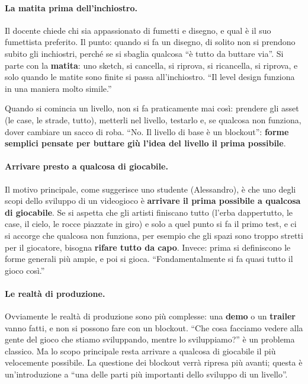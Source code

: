 \paragraph{La matita prima dell'inchiostro.} Il docente chiede chi sia
appassionato di fumetti e disegno, e qual è il suo fumettista preferito. Il
punto: quando si fa un disegno, di solito non si prendono subito gli
inchiostri, perché se si sbaglia qualcosa ``è tutto da buttare via''. Si parte
con la \textbf{matita}: uno sketch, si cancella, si riprova, si ricancella, si
riprova, e solo quando le matite sono finite si passa all'inchiostro. ``Il level
design funziona in una maniera molto simile.''

Quando si comincia un livello, non si fa praticamente mai così: prendere gli
asset (le case, le strade, tutto), metterli nel livello, testarlo e, se qualcosa
non funziona, dover cambiare un sacco di roba. ``No. Il livello di base è un
blockout'': \textbf{forme semplici pensate per buttare giù l'idea del livello il
prima possibile}.

\paragraph{Arrivare presto a qualcosa di giocabile.} Il motivo principale, come
suggerisce uno studente (Alessandro), è che uno degli scopi dello sviluppo di un
videogioco è \textbf{arrivare il prima possibile a qualcosa di giocabile}. Se si
aspetta che gli artisti finiscano tutto (l'erba dappertutto, le case, il cielo,
le rocce piazzate in giro) e solo a quel punto si fa il primo test, e ci si
accorge che qualcosa non funziona, per esempio che gli spazi sono troppo stretti
per il giocatore, bisogna \textbf{rifare tutto da capo}. Invece: prima si
definiscono le forme generali più ampie, e poi si gioca. ``Fondamentalmente si
fa quasi tutto il gioco così.''

\paragraph{Le realtà di produzione.} Ovviamente le realtà di produzione sono
più complesse: una \textbf{demo} o un \textbf{trailer} vanno fatti, e non si
possono fare con un blockout. ``Che cosa facciamo vedere alla gente del gioco
che stiamo sviluppando, mentre lo sviluppiamo?'' è un problema classico. Ma lo
scopo principale resta arrivare a qualcosa di giocabile il più velocemente
possibile. La questione dei blockout verrà ripresa più avanti; questa è
un'introduzione a ``una delle parti più importanti dello sviluppo di un
livello''.

